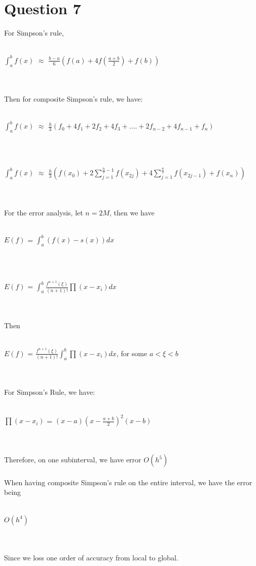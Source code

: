 \documentclass[11pt]{article} %
\begin{document}
\section{Question 7}
For Simpson's rule,\\\\
\centerline{$\int_{a}^{b}f(x)$ $\approx$ $\frac{b-a}{6}(f(a)+4f(\frac{a+b}{2})+f(b))$}\\\\
Then for composite Simpson's rule, we have:\\\\
\centerline{$\int_{a}^{b}f(x)$ $\approx$ $\frac{h}{3}(f_0+4f_1+2f_2+4f_3+....+2f_{n-2}+4f_{n-1}+f_n)$ }\\\\
\centerline{$\int_{a}^{b}f(x)$ $\approx$ $\frac{h}{3}(f(x_{0})+2\sum_{j=1}^{\frac{n}{2}-1}f(x_{2j})+4\sum_{j=1}^{\frac{n}{2}}f(x_{2j-1})+f(x_{n}))$}\\\\
For the error analysis, let $n = 2M$, then we have\\\\
\centerline{$E(f)$ = $\int_{a}^{b}(f(x)-s(x))dx$}\\\\
\centerline{$E(f)$ = $\int_{a}^{b}\frac{f^{n+1}(\xi)}{(n+1)!}\prod(x-x_{i})dx$}\\\\
Then\\\\
\centerline{$E(f)$ = $\frac{f^{n+1}(\xi)}{(n+1)!}\int_{a}^{b}\prod(x-x_{i})dx$, for some $a<\xi<b$}\\\\
For Simpson's Rule, we have:\\\\
\centerline{$\prod(x-x_{i})$ = $(x-a)(x-\frac{a+b}{2})^{2}(x-b)$}\\\\
Therefore, on one subinterval, we have error $O(h^{5})$\\\\
When having composite Simpson's rule on the entire interval, we have the error being\\\\
\centerline{$O(h^{4})$}\\\\
Since we loss one order of accuracy from local to global.
\end{document}
